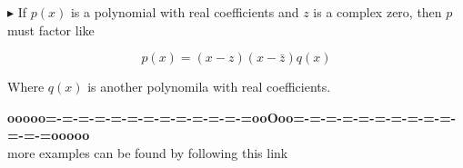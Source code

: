 \documentclass{ximera}
\begin{document}
\textbf{\textcolor{red!90!darkgray}{$\blacktriangleright$}}   If $p(x)$ is a polynomial with real coefficients and $z$ is a complex zero, then $p$ must factor like


\[ p(x) = (x-z) (x-\bar{z}) q(x)    \]

Where $q(x)$ is another polynomila with real coefficients.










\begin{center}
\textbf{\textcolor{green!50!black}{ooooo=-=-=-=-=-=-=-=-=-=-=-=-=ooOoo=-=-=-=-=-=-=-=-=-=-=-=-=ooooo}} \\

more examples can be found by following this link\\ 

\end{center}
\end{document}
